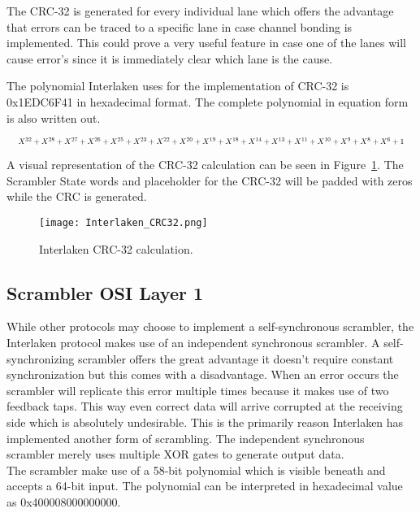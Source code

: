 	The CRC-32 is generated for every individual lane which offers the advantage that errors can be traced to a specific lane in case channel bonding is implemented. This could prove a very useful feature in case one of the lanes will cause error's since it is immediately clear which lane is the cause.
	
	The polynomial Interlaken uses for the implementation of CRC-32 is 0x1EDC6F41 in hexadecimal format. The complete polynomial in equation form is also written out.
	
	\begin{displaymath}
		\resizebox{\textwidth}{!} {
		$X^{32}+X^{28}+X^{27}+X^{26}+X^{25}+X^{23}+X^{22}+X^{20}+X^{19}+X^{18}+X^{14}+X^{13}+X^{11}+X^{10}+X^{9}+X^{8}+X^{6}+1 $ }
	\end{displaymath}
	
	A visual representation of the CRC-32 calculation can be seen in Figure~\ref{Fig:Interlaken_CRC32}. The Scrambler State words and placeholder for the CRC-32 will be padded with zeros while the CRC is generated.
	
	\begin{figure}[H]
		\centering
		\texttt{[image: Interlaken\_CRC32.png]}	
		\caption{Interlaken CRC-32 calculation.}
		\label{Fig:Interlaken_CRC32}
	\end{figure}
\newpage


\subsection[Scrambler]{Scrambler \hfill OSI Layer 1}
	While other protocols may choose to implement a self-synchronous scrambler, the Interlaken protocol makes use of an independent synchronous scrambler. A self-synchronizing scrambler offers the great advantage it doesn't require constant synchronization but this comes with a disadvantage. When an error occurs the scrambler will replicate this error multiple times because it makes use of two feedback taps. This way even correct data will arrive corrupted at the receiving side which is absolutely undesirable. This is the primarily reason Interlaken has implemented another form of scrambling. The independent synchronous scrambler merely uses multiple XOR gates to generate output data. \\
	
	The scrambler make use of a 58-bit polynomial which is visible beneath and accepts a 64-bit input. The polynomial can be interpreted in hexadecimal value as 0x400008000000000.
	
